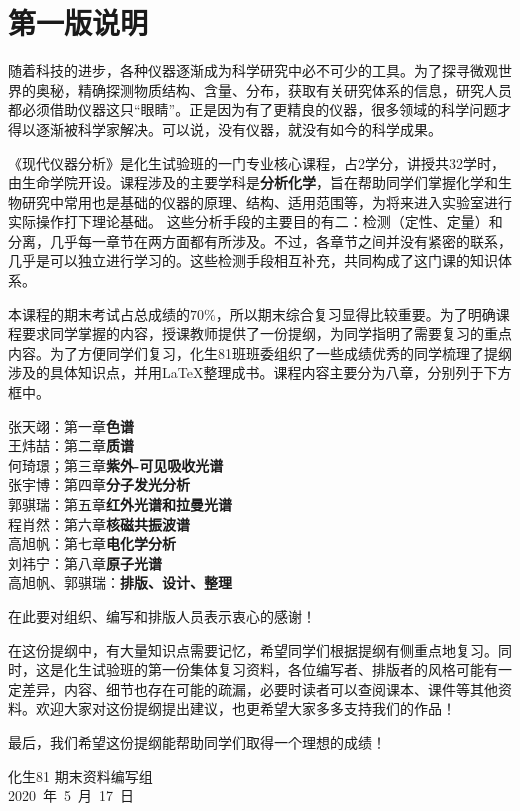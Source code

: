 \chapter*{第一版说明}

随着科技的进步，各种仪器逐渐成为科学研究中必不可少的工具。为了探寻微观世界的奥秘，精确探测物质结构、含量、分布，获取有关研究体系的信息，研究人员都必须借助仪器这只“眼睛”。正是因为有了更精良的仪器，很多领域的科学问题才得以逐渐被科学家解决。可以说，没有仪器，就没有如今的科学成果。

《现代仪器分析》是化生试验班的一门专业核心课程，占2学分，讲授共32学时，由生命学院开设。课程涉及的主要学科是\textbf{分析化学}，旨在帮助同学们掌握化学和生物研究中常用也是基础的仪器的原理、结构、适用范围等，为将来进入实验室进行实际操作打下理论基础。
这些分析手段的主要目的有二：检测（定性、定量）和分离，几乎每一章节在两方面都有所涉及。不过，各章节之间并没有紧密的联系，几乎是可以独立进行学习的。这些检测手段相互补充，共同构成了这门课的知识体系。

本课程的期末考试占总成绩的$70\%$，所以期末综合复习显得比较重要。为了明确课程要求同学掌握的内容，授课教师提供了一份提纲，为同学指明了需要复习的重点内容。为了方便同学们复习，化生81班班委组织了一些成绩优秀的同学梳理了提纲涉及的具体知识点，并用\LaTeX 整理成书。课程内容主要分为八章，分别列于下方框中。
\begin{tcolorbox}[title={\bfseries 编写组成员}]
	 张天翊：第一章\hspace{1em}\textbf{色谱}\\
	 王炜喆：第二章\hspace{1em}\textbf{质谱}\\
	 何琦璟；第三章\hspace{1em}\textbf{紫外-可见吸收光谱}\\
	 张宇博：第四章\hspace{1em}\textbf{分子发光分析}\\
	 郭骐瑞：第五章\hspace{1em}\textbf{红外光谱和拉曼光谱}\\
	 程肖然：第六章\hspace{1em}\textbf{核磁共振波谱}\\
	 高旭帆：第七章\hspace{1em}\textbf{电化学分析}\\
	 刘祎宁：第八章\hspace{1em}\textbf{原子光谱}\\
	 高旭帆、郭骐瑞：\textbf{排版、设计、整理}
\end{tcolorbox}
在此要对组织、编写和排版人员表示衷心的感谢！

在这份提纲中，有大量知识点需要记忆，希望同学们根据提纲有侧重点地复习。同时，这是化生试验班的第一份集体复习资料，各位编写者、排版者的风格可能有一定差异，内容、细节也存在可能的疏漏，必要时读者可以查阅课本、课件等其他资料。欢迎大家对这份提纲提出建议，也更希望大家多多支持我们的作品！

最后，我们希望这份提纲能帮助同学们取得一个理想的成绩！

\vskip 1.5cm

\begin{flushright}
	化生81 期末资料编写组\\
	2020\ 年\ 5\ 月\ 17\ 日
\end{flushright}